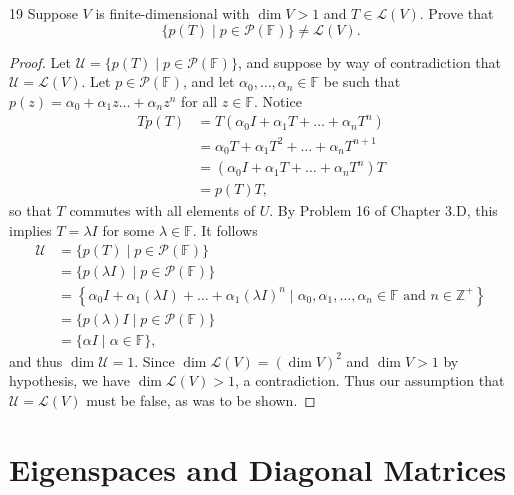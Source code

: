 \documentclass{extarticle}
\newenvironment{problem}[1]{\begin{prob*}{#1}{}}{\end{prob*}}
\newcommand{\Z}{\mathbb{Z}}
\newcommand{\F}{\mathbb{F}}
\newcommand{\poly}{\mathcal{P}}
\newcommand{\Hom}{\mathcal{L}}
\begin{document}
\begin{problem}{19}
Suppose $V$ is finite-dimensional with $\dim V> 1$ and $T\in\Hom(V)$.  Prove that
\begin{equation*}
\{p(T) \mid p\in\poly(\F)\}\neq \Hom(V).
\end{equation*}
\end{problem}
\begin{proof}
Let $\mathcal{U} = \{p(T) \mid p\in\poly(\F)\}$, and suppose by way of contradiction that $\mathcal{U} = \Hom(V)$.  Let $p \in \poly(\F)$, and let $\alpha_0,\dots,\alpha_n\in\F$ be such that $p(z) = \alpha_0 + \alpha_1z \dots + \alpha_nz^n$ for all $z\in\F$.  Notice
\begin{align*}
Tp(T) &= T\left(\alpha_0 I + \alpha_1 T + \dots + \alpha_n T^n\right)\\
&= \alpha_0T + \alpha_1T^2 + \dots + \alpha_nT^{n+1}\\
&= \left(\alpha_0 I + \alpha_1 T + \dots + \alpha_n T^n\right)T\\
&= p(T) T,
\end{align*}
so that $T$ commutes with all elements of $U$.  By Problem 16 of Chapter 3.D, this implies $T= \lambda I$ for some $\lambda\in \F$.  It follows
\begin{align*}
\mathcal{U} &= \{p(T) \mid p\in\poly(\F)\}\\
 &= \{p(\lambda I)\mid p\in\poly(\F)\}\\
 &=\left\{\alpha_0I + \alpha_1(\lambda I) + \dots +\alpha_1(\lambda I)^n\mid \alpha_0,\alpha_1,\dots,\alpha_n\in\F\text{ and }n\in\Z^+\right\}\\
 &=\{p(\lambda)I\mid p\in\poly(\F)\}\\
 &=\{\alpha I \mid \alpha\in\F\},
\end{align*}
and thus $\dim\mathcal{U} = 1$.  Since $\dim\Hom(V) = (\dim V)^2$ and $\dim V > 1$ by hypothesis, we have $\dim\Hom(V) > 1$, a contradiction.  Thus our assumption that $\mathcal{U} = \Hom(V)$ must be false, as was to be shown.
\end{proof}


\section{Eigenspaces and Diagonal Matrices}
\end{document}
